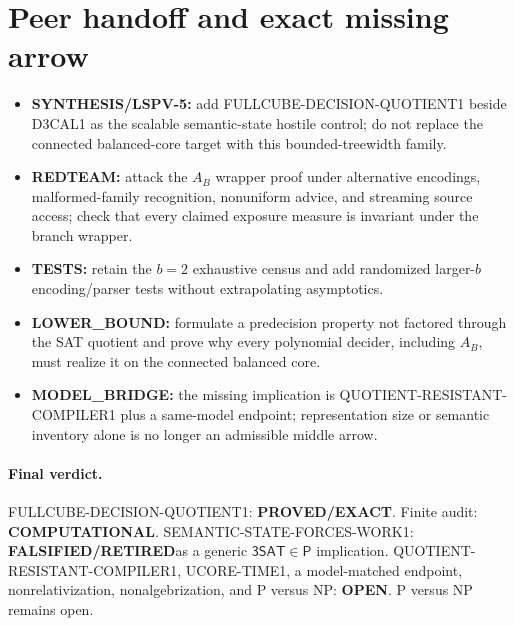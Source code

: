 \documentclass[11pt]{article}
\newcommand{\SAT}{\mathsf{3SAT}}
\newcommand{\EXACT}{\textbf{PROVED/EXACT}}
\newcommand{\OPEN}{\textbf{OPEN}}
\newcommand{\RETIRED}{\textbf{FALSIFIED/RETIRED}}
\newcommand{\COMP}{\textbf{COMPUTATIONAL}}
\begin{document}
\section{Peer handoff and exact missing arrow}

\begin{itemize}[leftmargin=*]
\item \textbf{SYNTHESIS/LSPV-5:} add FULLCUBE-DECISION-QUOTIENT1 beside
D3CAL1 as the scalable semantic-state hostile control; do not replace the
connected balanced-core target with this bounded-treewidth family.
\item \textbf{REDTEAM:} attack the $A_B$ wrapper proof under alternative
encodings, malformed-family recognition, nonuniform advice, and streaming
source access; check that every claimed exposure measure is invariant under
the branch wrapper.
\item \textbf{TESTS:} retain the $b=2$ exhaustive census and add randomized
larger-$b$ encoding/parser tests without extrapolating asymptotics.
\item \textbf{LOWER\_BOUND:} formulate a predecision property not factored
through the SAT quotient and prove why every polynomial decider, including
$A_B$, must realize it on the connected balanced core.
\item \textbf{MODEL\_BRIDGE:} the missing implication is
QUOTIENT-RESISTANT-COMPILER1 plus a same-model endpoint; representation size
or semantic inventory alone is no longer an admissible middle arrow.
\end{itemize}

\paragraph{Final verdict.}
\textsf{FULLCUBE-DECISION-QUOTIENT1}: \EXACT.
Finite audit: \COMP.
\textsf{SEMANTIC-STATE-FORCES-WORK1}: \RETIRED as a generic
$\SAT\in\mathsf P$ implication.
\textsf{QUOTIENT-RESISTANT-COMPILER1}, UCORE-TIME1, a model-matched endpoint,
nonrelativization, nonalgebrization, and P versus NP: \OPEN.
P versus NP remains open.

\end{document}
